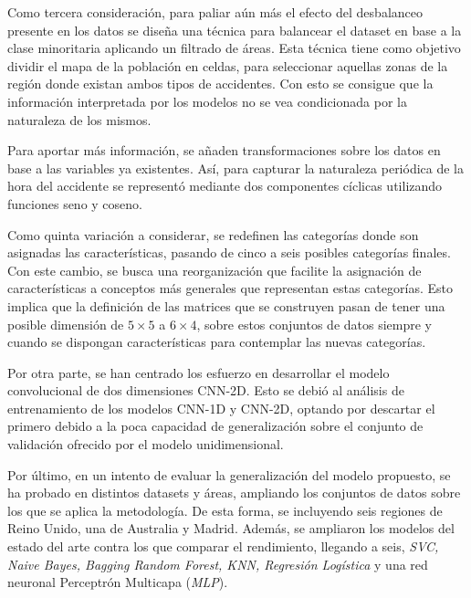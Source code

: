 Como tercera consideración, para paliar aún más el efecto del desbalanceo presente en los datos se diseña una técnica para balancear el dataset en base a la clase minoritaria aplicando un filtrado de áreas. Esta técnica tiene como objetivo dividir el mapa de la población en celdas, para seleccionar aquellas zonas de la región donde existan ambos tipos de accidentes. Con esto se consigue que la información interpretada por los modelos no se vea condicionada por la naturaleza de los mismos.

Para aportar más información, se añaden transformaciones sobre los datos en base a las variables ya existentes. Así, para capturar la naturaleza periódica de la hora del accidente se representó mediante dos componentes cíclicas utilizando funciones seno y coseno. 



Como quinta variación a considerar, se redefinen las categorías donde son asignadas las características, pasando de cinco a seis posibles categorías finales. Con este cambio, se busca una reorganización que facilite la asignación de características a conceptos más generales que representan estas categorías. Esto implica que la definición de las matrices que se construyen pasan de tener una posible dimensión de $5\times5$ a $6\times4$, sobre estos conjuntos de datos siempre y cuando se dispongan características para contemplar las nuevas categorías.

Por otra parte, se han centrado los esfuerzo en desarrollar el modelo convolucional de dos dimensiones CNN-2D. Esto se debió al análisis de entrenamiento de los modelos CNN-1D y CNN-2D, optando por descartar el primero debido a la poca capacidad de generalización sobre el conjunto de validación ofrecido por el modelo unidimensional.

Por último, en un intento de evaluar la generalización del modelo propuesto, se ha probado en distintos datasets y áreas, ampliando los conjuntos de datos sobre los que se aplica la metodología. De esta forma, se incluyendo seis regiones de Reino Unido, una de Australia y Madrid. Además, se ampliaron los modelos del estado del arte contra los que comparar el rendimiento, llegando a seis, \textit{SVC, Naive Bayes, Bagging Random Forest, KNN, Regresión Logística} y una red neuronal Perceptrón Multicapa (\textit{MLP}).

